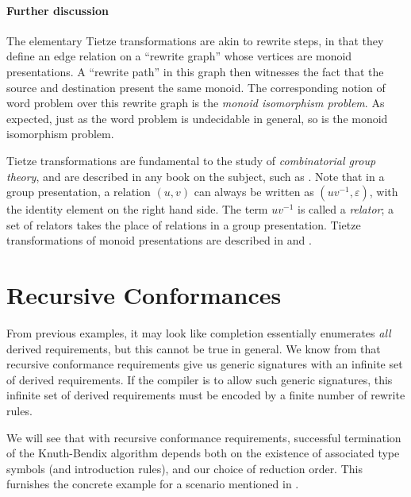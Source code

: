 \documentclass[../generics]{subfiles}
\begin{document}
\paragraph{Further discussion}
The elementary Tietze transformations are akin to rewrite steps, in that they define an edge relation on a ``rewrite graph'' whose vertices are monoid presentations. A ``rewrite path'' in this graph then witnesses the fact that the source and destination present the same monoid. The corresponding notion of word problem over this rewrite graph is the \emph{monoid isomorphism problem}. As expected, just as the word problem is undecidable in general, so is the monoid isomorphism problem.

Tietze transformations are fundamental to the study of \emph{combinatorial group theory}, and are described in any book on the subject, such as \cite{combinatorialgroup}. Note that in a group presentation, a relation $(u, v)$ can always be written as $(uv^{-1},\varepsilon)$, with the identity element on the right hand side. The term $uv^{-1}$ is called a \emph{relator}; a set of relators takes the place of relations in a group presentation. Tietze transformations of monoid presentations are described in \cite{book2012string} and \cite{henry2021tietze}.

\section{Recursive Conformances}\label{recursive conformances redux}

From previous examples, it may look like completion essentially enumerates \emph{all} derived requirements, but this cannot be true in general. We know from  that recursive conformance requirements give us generic signatures with an infinite set of derived requirements. If the compiler is to allow such generic signatures, this infinite set of derived requirements must be encoded by a finite number of rewrite rules.

We will see that with recursive conformance requirements, successful termination of the Knuth-Bendix algorithm depends both on the existence of associated type symbols (and introduction rules), and our choice of reduction order. This furnishes the concrete example for a scenario mentioned in .
\end{document}
